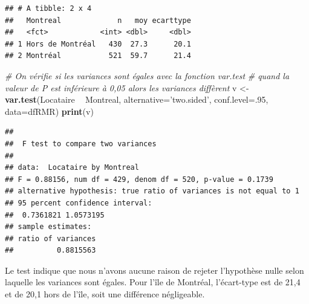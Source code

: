 \documentclass[
  11pt,
  french,
]{book}
\makeatletter
\newenvironment{Shaded}{\begin{snugshade}}{\end{snugshade}}
\newcommand{\CommentTok}[1]{\textcolor[rgb]{0.56,0.35,0.01}{\textit{#1}}}
\newcommand{\DataTypeTok}[1]{\textcolor[rgb]{0.13,0.29,0.53}{#1}}
\newcommand{\DecValTok}[1]{\textcolor[rgb]{0.00,0.00,0.81}{#1}}
\newcommand{\KeywordTok}[1]{\textcolor[rgb]{0.13,0.29,0.53}{\textbf{#1}}}
\newcommand{\NormalTok}[1]{#1}
\newcommand{\OperatorTok}[1]{\textcolor[rgb]{0.81,0.36,0.00}{\textbf{#1}}}
\newcommand{\OtherTok}[1]{\textcolor[rgb]{0.56,0.35,0.01}{#1}}
\newcommand{\StringTok}[1]{\textcolor[rgb]{0.31,0.60,0.02}{#1}}
\newenvironment{kframe}{%
\medskip{}
\setlength{\fboxsep}{.8em}
 \def\at@end@of@kframe{}%
 \ifinner\ifhmode%
  \def\at@end@of@kframe{\end{minipage}}%
  \begin{minipage}{\columnwidth}%
 \fi\fi%
 \def\FrameCommand##1{\hskip\@totalleftmargin \hskip-\fboxsep
 \colorbox{shadecolor}{##1}\hskip-\fboxsep
     \hskip-\linewidth \hskip-\@totalleftmargin \hskip\columnwidth}%
 \MakeFramed {\advance\hsize-\width
   \@totalleftmargin\z@ \linewidth\hsize
   \@setminipage}}%
 {\par\unskip\endMakeFramed%
 \at@end@of@kframe}
\renewenvironment{Shaded}{\begin{kframe}}{\end{kframe}}
\makeatother
\begin{document}
\begin{Shaded}
\end{Shaded}

\begin{verbatim}
## # A tibble: 2 x 4
##   Montreal             n   moy ecarttype
##   <fct>            <int> <dbl>     <dbl>
## 1 Hors de Montréal   430  27.3      20.1
## 2 Montréal           521  59.7      21.4
\end{verbatim}

\begin{Shaded}
\begin{Highlighting}[]
\CommentTok{# On vérifie si les variances sont égales avec la fonction var.test}
\CommentTok{# quand la valeur de P est inférieure à 0,05 alors les variances diffèrent}
\NormalTok{v <-}\StringTok{ }\KeywordTok{var.test}\NormalTok{(Locataire }\OperatorTok{~}\StringTok{ }\NormalTok{Montreal, }\DataTypeTok{alternative=}\StringTok{'two.sided'}\NormalTok{, }\DataTypeTok{conf.level=}\NormalTok{.}\DecValTok{95}\NormalTok{, }\DataTypeTok{data=}\NormalTok{dfRMR)}
\KeywordTok{print}\NormalTok{(v)}
\end{Highlighting}
\end{Shaded}

\begin{verbatim}
## 
## 	F test to compare two variances
## 
## data:  Locataire by Montreal
## F = 0.88156, num df = 429, denom df = 520, p-value = 0.1739
## alternative hypothesis: true ratio of variances is not equal to 1
## 95 percent confidence interval:
##  0.7361821 1.0573195
## sample estimates:
## ratio of variances 
##          0.8815563
\end{verbatim}

Le test indique que nous n'avons aucune raison de rejeter l'hypothèse nulle selon laquelle les variances sont égales. Pour l'île de Montréal, l'écart-type est de 21,4 et de 20,1 hors de l'île, soit une différence négligeable.
\end{document}
